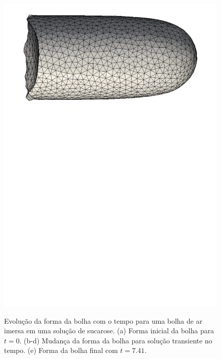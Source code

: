 \documentclass[a4paper,portuges]{article}
\begin{document}
\begin{figure}[h!]
\begin{center}
			{\includegraphics[angle=90,scale=0.29]{figs/sucrose-5.pdf}}
 	\end{center}
	\caption{Evolução da forma da bolha com o tempo para uma bolha de ar
	imersa em uma solução de sucarose. (a) Forma inicial da bolha para
	$t=0$. (b-d) Mudança da forma da bolha para solução transiente no
	tempo. (e) Forma da bolha final com $t=7.41$.} 
	\label{fig:sucrose} 
 \end{figure}
\end{document}
